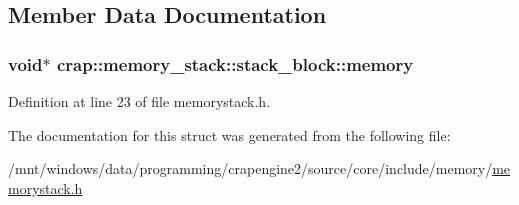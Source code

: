 \subsection{Member Data Documentation}
\hypertarget{structcrap_1_1memory__stack_1_1stack__block_a8c47af0e38c75271a11e2b29f963cc99}{
\subsubsection[{memory}]{\setlength{\rightskip}{0pt plus 5cm}void$\ast$ crap\+::memory\+\_\+stack\+::stack\+\_\+block\+::memory}}\label{structcrap_1_1memory__stack_1_1stack__block_a8c47af0e38c75271a11e2b29f963cc99}


Definition at line 23 of file memorystack.\+h.



The documentation for this struct was generated from the following file\+:\begin{DoxyCompactItemize}
\item 
/mnt/windows/data/programming/crapengine2/source/core/include/memory/\hyperlink{memorystack_8h}{memorystack.\+h}\end{DoxyCompactItemize}

